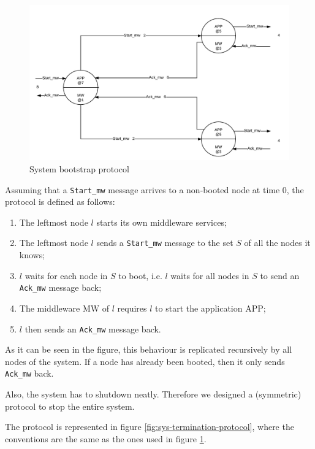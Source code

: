 \begin{figure}[H]
  \centering
  \includegraphics[width=\columnwidth]{sections/images/solution/bootstrap.pdf}
  \caption{System bootstrap protocol}
  \label{fig:sys-bootstrap-protocol}
\end{figure}

Assuming that a \texttt{Start\_mw} message arrives to a non-booted node at time
0, the protocol is defined as follows:

\begin{enumerate}
  \item The leftmost node $l$ starts its own middleware services;
  \item The leftmost node $l$ sends a \texttt{Start\_mw} message to the set
    $S$ of all the nodes it knows;
  \item $l$ waits for each node in $S$ to boot, i.e. $l$ waits for all nodes
    in $S$ to send an \texttt{Ack\_mw} message back;
  \item The middleware MW of $l$ requires $l$ to start the application APP;
  \item $l$ then sends an \texttt{Ack\_mw} message back.
\end{enumerate}

As it can be seen in the figure, this behaviour is replicated recursively
by all nodes of the system. If a node has already been booted, then it only
sends \texttt{Ack\_mw} back.

Also, the system has to shutdown neatly. Therefore we designed a (symmetric)
protocol to stop the entire system.

The protocol is represented in figure \ref{fig:sys-termination-protocol}, where
the conventions are the same as the ones used in figure
\ref{fig:sys-bootstrap-protocol}.

